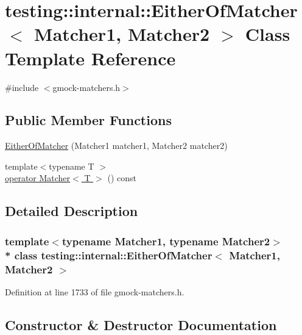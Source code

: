 \hypertarget{classtesting_1_1internal_1_1_either_of_matcher}{}\section{testing\+:\+:internal\+:\+:Either\+Of\+Matcher$<$ Matcher1, Matcher2 $>$ Class Template Reference}
\label{classtesting_1_1internal_1_1_either_of_matcher}


{\ttfamily \#include $<$gmock-\/matchers.\+h$>$}

\subsection*{Public Member Functions}
\begin{DoxyCompactItemize}
\item 
\hyperlink{classtesting_1_1internal_1_1_either_of_matcher_a5ae2361f20a0460870b72b83fcc0c643}{Either\+Of\+Matcher} (Matcher1 matcher1, Matcher2 matcher2)
\item 
{\footnotesize template$<$typename T $>$ }\\\hyperlink{classtesting_1_1internal_1_1_either_of_matcher_acadc386ae63637fa408ee4d7154e9723}{operator Matcher$<$ T $>$} () const 
\end{DoxyCompactItemize}


\subsection{Detailed Description}
\subsubsection*{template$<$typename Matcher1, typename Matcher2$>$\\*
class testing\+::internal\+::\+Either\+Of\+Matcher$<$ Matcher1, Matcher2 $>$}



Definition at line 1733 of file gmock-\/matchers.\+h.



\subsection{Constructor \& Destructor Documentation}
